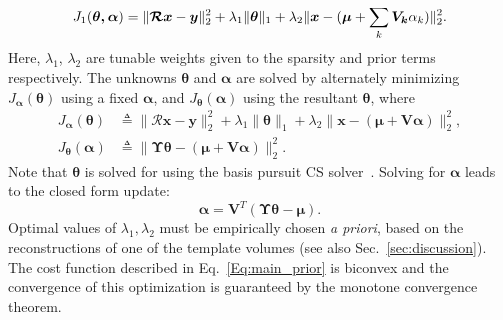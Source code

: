 \documentclass[journal]{IEEEtran}
\begin{document}
\vspace{4mm}
 \begin{equation}
   \setlength{\belowdisplayskip}{0pt} \setlength{\belowdisplayshortskip}{0pt}
\setlength{\abovedisplayskip}{-2pt} \setlength{\abovedisplayshortskip}{-2pt}
J_1(\boldsymbol{\theta,\alpha}) = \lVert\boldsymbol{\mathcal{R} x}- \boldsymbol{y}\rVert_2^2  + \lambda_1\lVert\boldsymbol{\theta}\rVert_1+\lambda_2\lVert\boldsymbol{x} - (\boldsymbol{\mu} + \sum_{k}\boldsymbol{V_k}\alpha_k)\rVert_2^2.
\label{Eq:main_prior}
\end{equation}
Here, $\lambda_1$, $\lambda_2$ are tunable weights given to the sparsity and prior terms respectively. The unknowns $\boldsymbol{\theta}$ and $\boldsymbol{\alpha}$
are solved by alternately minimizing $J_{\boldsymbol{\alpha}}(\boldsymbol{\theta})$ using a fixed $\boldsymbol{\alpha}$, and $J_{\boldsymbol\theta}(\boldsymbol{\alpha})$ using the resultant $\boldsymbol{\theta}$, where 
\begin{align}
J_{\boldsymbol{\alpha}}(\boldsymbol{\theta}) &\triangleq \lVert\boldsymbol{\mathcal{R} x- y}\rVert_2^2  + \lambda_1\lVert\boldsymbol{\theta}\rVert_1+\lambda_2\lVert\boldsymbol{x} - (\boldsymbol{\mu + V\alpha})\rVert_2^2, \\
J_{\boldsymbol\theta}(\boldsymbol{\alpha}) &\triangleq \lVert\boldsymbol{\Upsilon\theta} - (\boldsymbol{\mu + V\alpha})\rVert_2^2.
\end{align}
Note that $\boldsymbol{\theta}$ is solved for using the basis pursuit CS solver~\cite{l1ls}. Solving for $\boldsymbol{\alpha}$ leads to the closed form update:
\begin{equation}
\boldsymbol{\boldsymbol{\alpha}} = \boldsymbol{V}^T(\boldsymbol{\Upsilon \theta} -\boldsymbol{\mu}).
\end{equation}
 Optimal values of $\lambda_1, \lambda_2$ must be empirically chosen \textit{a priori}, based on the reconstructions of one of the template volumes (see also Sec.~\ref{sec:discussion}). The cost function described in Eq.~\ref{Eq:main_prior} is biconvex and the convergence of this optimization is guaranteed by the monotone convergence theorem.
 \vspace{2mm}
\end{document}
